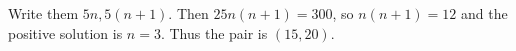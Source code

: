 Write them $5n,5(n+1)$. Then $25n(n+1)=300$, so $n(n+1)=12$ and the positive solution is $n=3$. Thus the pair is $\boxed{(15,20)}$.
